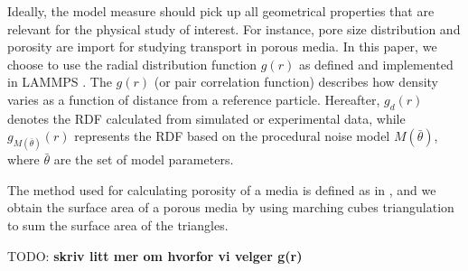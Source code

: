 \documentclass[aps,pre,twocolumn,letterpaper,floatfix,showpacs]{revtex4}
\newcommand{\todo}[1]{ {\color{Magenta} TODO: \color{Blue} \textbf{#1} }}
\begin{document}
Ideally, the model measure should pick up all geometrical properties that are relevant for the physical study of interest. For instance, pore size distribution and porosity are import for studying transport in porous media. In this paper, we choose to use the radial distribution function $g(r)$ as defined and implemented in LAMMPS \cite{plimpton1995fast}. The $g(r)$ (or pair correlation function) describes how density varies as a function of distance from a reference particle. Hereafter, $g_d(r)$ denotes the RDF calculated from simulated or experimental data, while $g_{M(\bar \theta)}(r)$ represents the RDF based on the procedural noise model $M(\bar \theta)$, where $\bar \theta$ are the set of model parameters. 

The method used for calculating porosity of a media is defined as in \cite{gelb1998characterization}, and we obtain the surface area of a porous media by using marching cubes triangulation to sum the surface area of the triangles. 

\todo{skriv litt mer om hvorfor vi velger g(r)}











\end{document}
